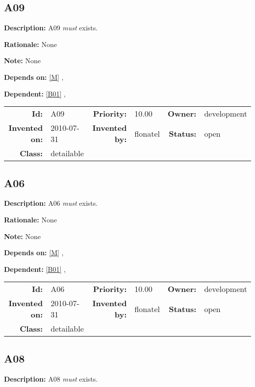 \subsection{A09}\label{A09}
\textbf{Description:} A09 \textsl{must} exists.

\textbf{Rationale:} None

\textbf{Note:} None

\textbf{Depends on:} \ref{M} , 

\textbf{Dependent:} \ref{B01} , 

\par
{\small \begin{center}\begin{tabular}{rlrlrl}
\textbf{Id:} & A09 & \textbf{Priority:} & 10.00 & \textbf{Owner:} & development \\ 
\textbf{Invented on:} & 2010-07-31 & \textbf{Invented by:} & flonatel & \textbf{Status:} & open \\ 
\textbf{Class:} & detailable & & & & \\ 
\end{tabular}\end{center} }%
\subsection{A06}\label{A06}
\textbf{Description:} A06 \textsl{must} exists.

\textbf{Rationale:} None

\textbf{Note:} None

\textbf{Depends on:} \ref{M} , 

\textbf{Dependent:} \ref{B01} , 

\par
{\small \begin{center}\begin{tabular}{rlrlrl}
\textbf{Id:} & A06 & \textbf{Priority:} & 10.00 & \textbf{Owner:} & development \\ 
\textbf{Invented on:} & 2010-07-31 & \textbf{Invented by:} & flonatel & \textbf{Status:} & open \\ 
\textbf{Class:} & detailable & & & & \\ 
\end{tabular}\end{center} }%
\subsection{A08}\label{A08}
\textbf{Description:} A08 \textsl{must} exists.


